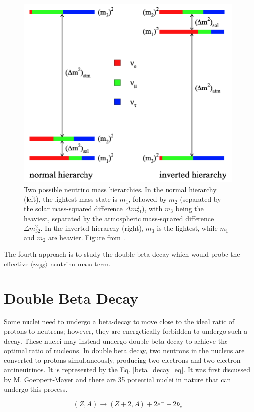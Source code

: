 \begin{figure}[!htb]
\centering
\includegraphics[width=0.7\linewidth]{ch1/figs/mass_hierarchies.png}
\caption{Two possible neutrino mass hierarchies. In the normal hierarchy (left), the lightest mass state is \( m_1 \), followed by \( m_2 \) (separated by the solar mass-squared difference \( \Delta m^2_{21} \)), with \( m_3 \) being the heaviest, separated by the atmospheric mass-squared difference \( \Delta m^2_{32} \). In the inverted hierarchy (right), \( m_3 \) is the lightest, while \( m_1 \) and \( m_2 \) are heavier. Figure from \cite{Hewett:2012ns}.}
\label{mass_hierarchies_fig}
\end{figure}

The fourth approach is to study the double-beta decay which would probe the effective $\langle m_{\beta\beta}\rangle$ neutrino mass term.

\section{Double Beta Decay}
Some nuclei need to undergo a beta-decay to move close to the ideal ratio of protons to neutrons; however, they are energetically forbidden to undergo such a decay. These nuclei may instead undergo double beta decay to achieve the optimal ratio of nucleons. In double beta decay, two neutrons in the nucleus are converted to protons simultaneously, producing two electrons and two electron antineutrinos. It is represented by the Eq. \ref{beta_decay_eq}. It was first discussed by M. Goeppert-Mayer and there are 35 potential nuclei in nature that can undergo this process\cite{ZUBER_2012}.

\begin{equation}\label{beta_decay_eq}
(Z,A) \rightarrow (Z+2,A) + 2e^- + 2\bar{\nu}_e
\end{equation}

